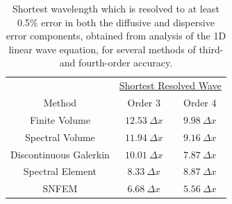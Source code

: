 \documentclass[11pt]{article}
\begin{document}

\begin{table}
\begin{center}
\begin{tabular}{ccc}
\hline & \multicolumn{2}{c}{\underline{Shortest Resolved Wave}} \\
Method & Order 3 & Order 4 \\
\hline \hline Finite Volume & $12.53\ \Delta x$ & $9.98\ \Delta x$ \\
Spectral Volume & $11.94\ \Delta x$ & $9.16\ \Delta x$ \\
Discontinuous Galerkin & $10.01\ \Delta x$ & $7.87\ \Delta x$ \\
Spectral Element & $8.33\ \Delta x$ & $8.87\ \Delta x$ \\
SNFEM & $6.68\ \Delta x$ & $5.56\ \Delta x$ \\
\hline
\end{tabular}
\end{center}
\caption{Shortest wavelength which is resolved to at least 0.5\% error in both the diffusive and dispersive error components, obtained from analysis of the 1D linear wave equation, for several methods of third- and fourth-order accuracy.} \label{tab:ShortestResolvedWave}
\end{table}
\end{document}
